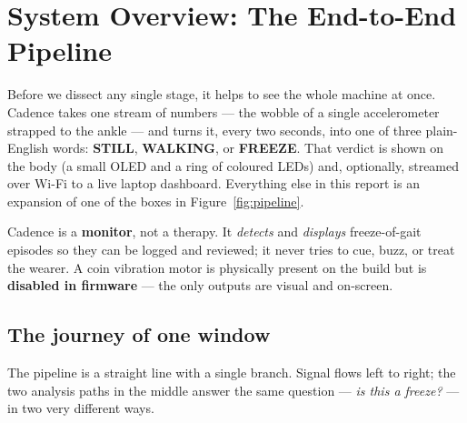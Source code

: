 \section{System Overview: The End-to-End Pipeline}
\label{sec:overview}

Before we dissect any single stage, it helps to see the whole machine at once. Cadence
takes one stream of numbers --- the wobble of a single accelerometer strapped to the
ankle --- and turns it, every two seconds, into one of three plain-English words:
\textcolor{grn}{\textbf{STILL}}, \textcolor{steel}{\textbf{WALKING}}, or
\textcolor{freeze}{\textbf{FREEZE}}. That verdict is shown on the body (a small OLED and
a ring of coloured LEDs) and, optionally, streamed over Wi-Fi to a live laptop dashboard.
Everything else in this report is an expansion of one of the boxes in
Figure~\ref{fig:pipeline}.

\begin{keyidea}
Cadence is a \textbf{monitor}, not a therapy. It \emph{detects} and \emph{displays}
freeze-of-gait episodes so they can be logged and reviewed; it never tries to cue, buzz,
or treat the wearer. A coin vibration motor is physically present on the build but is
\textbf{disabled in firmware} --- the only outputs are visual and on-screen.
\end{keyidea}

\subsection{The journey of one window}

The pipeline is a straight line with a single branch. Signal flows left to right; the
two analysis paths in the middle answer the same question --- \emph{is this a freeze?}
--- in two very different ways.

